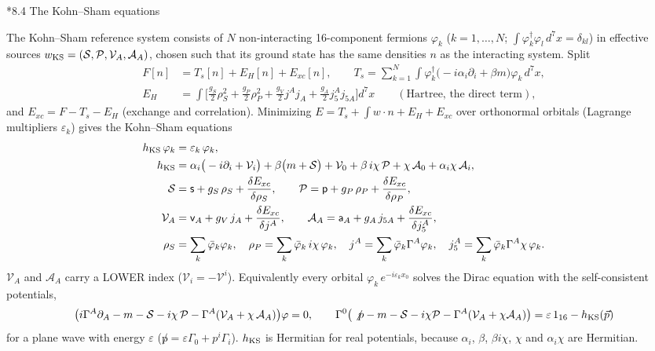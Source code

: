 \documentclass[10pt,a4paper]{article}
\makeatletter
\renewcommand\subsection{\@startsection{subsection}{2}{\z@}{-3.25ex\@plus -1ex \@minus -.2ex}{1.5ex \@plus .2ex}{\normalfont\large\bfseries\raggedright}}
\makeatother
\begin{document}
\subsection*{8.4 The Kohn–Sham equations}
The Kohn–Sham reference system consists of $N$ non-interacting 16-component fermions $\varphi_k$ ($k=1,\dots,N$; $\int\varphi_k^\dagger\varphi_l\,d^7x=\delta_{kl}$) in effective sources $w_{\rm KS}=(\mathcal S,\mathcal P,\mathcal V_A,\mathcal A_A)$, chosen such that its ground state has the same densities $n$ as the interacting system. Split
\begin{align*}
F[n]&=T_s[n]+E_H[n]+E_{xc}[n],\qquad T_s=\sum_{k=1}^{N}\int\varphi_k^\dagger\big(-i\alpha_i\partial_i+\beta m\big)\varphi_k\,d^7x, \\
E_H&=\int\Big[\frac{g_S}{2}\rho_S^2+\frac{g_P}{2}\rho_P^2+\frac{g_V}{2}j^Aj_A+\frac{g_A}{2}j_5^Aj_{5A}\Big]d^7x\qquad(\text{Hartree, the direct term}),
\end{align*}
and $E_{xc}=F-T_s-E_H$ (exchange and correlation). Minimizing $E=T_s+\int w\cdot n+E_H+E_{xc}$ over orthonormal orbitals (Lagrange multipliers $\varepsilon_k$) gives the Kohn–Sham equations
\begin{align*}
h_{\rm KS}\,\varphi_k&=\varepsilon_k\,\varphi_k, \\
h_{\rm KS}&=\alpha_i\big(-i\partial_i+\mathcal V_i\big)+\beta\big(m+\mathcal S\big)+\mathcal V_0+\beta\,i\chi\,\mathcal P+\chi\,\mathcal A_0+\alpha_i\chi\,\mathcal A_i, \\
\mathcal S&=\mathsf s+g_S\,\rho_S+\frac{\delta E_{xc}}{\delta\rho_S},\qquad \mathcal P=\mathsf p+g_P\,\rho_P+\frac{\delta E_{xc}}{\delta\rho_P}, \\
\mathcal V_A&=\mathsf v_A+g_V\,j_A+\frac{\delta E_{xc}}{\delta j^A},\qquad \mathcal A_A=\mathsf a_A+g_A\,j_{5A}+\frac{\delta E_{xc}}{\delta j_5^A}, \\
\rho_S&=\sum_k\bar\varphi_k\varphi_k,\quad \rho_P=\sum_k\bar\varphi_k\,i\chi\,\varphi_k,\quad j^A=\sum_k\bar\varphi_k\Gamma^A\varphi_k,\quad j_5^A=\sum_k\bar\varphi_k\Gamma^A\chi\,\varphi_k .
\end{align*}
$\mathcal V_A$ and $\mathcal A_A$ carry a LOWER index ($\mathcal V_i=-\mathcal V^i$). Equivalently every orbital $\varphi_k\,e^{-i\varepsilon_kx_0}$ solves the Dirac equation with the self-consistent potentials,
\begin{equation*}
\big(i\Gamma^A\partial_A-m-\mathcal S-i\chi\,\mathcal P-\Gamma^A(\mathcal V_A+\chi\,\mathcal A_A)\big)\varphi=0,\qquad \Gamma^0\big(\not p-m-\mathcal S-i\chi\mathcal P-\Gamma^A(\mathcal V_A+\chi\mathcal A_A)\big)=\varepsilon\,1_{16}-h_{\rm KS}(\vec p)
\end{equation*}
for a plane wave with energy $\varepsilon$ ($\not p=\varepsilon\Gamma_0+p^i\Gamma_i$). $h_{\rm KS}$ is Hermitian for real potentials, because $\alpha_i$, $\beta$, $\beta i\chi$, $\chi$ and $\alpha_i\chi$ are Hermitian.
\end{document}
